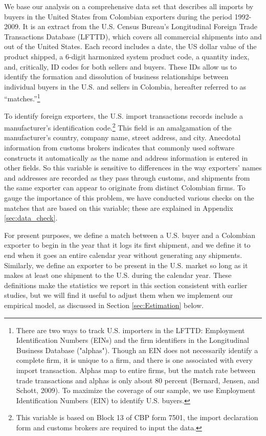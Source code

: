 \documentclass[12pt]{article}
\begin{document}
We base our analysis on a comprehensive
data set that describes all imports by buyers in the United States from
Colombian exporters during the period 1992-2009. It is an extract from the
U.S. Census Bureau's Longitudinal Foreign Trade Transactions Database
(LFTTD), which covers all commercial shipments into and out of the United
States. Each record includes a date, the US dollar value of the product
shipped, a 6-digit harmonized system product code, a quantity index, and,
critically, ID codes for both sellers and buyers. These IDs allow us to
identify the formation and dissolution of business relationships between
individual buyers in the U.S. and sellers in Colombia, hereafter referred to
as \textquotedblleft matches.\textquotedblright \footnote{%
There are two ways to track U.S. importers in the LFTTD: Employment
Identification Numbers (EINs) and the firm identifiers in the Longitudinal
Business Database ("alphas"). Though an EIN does not necessarily identify a
complete firm, it is unique to a firm, and there is one associated with
every import transaction. Alphas map to entire firms, but the match rate
between trade transactions and alphas is only about 80 percent (Bernard,
Jensen, and Schott, 2009). To maximize the coverage of our sample, we use
Employment Identification Numbers (EIN) to identify U.S. buyers.\medskip }\ 

To identify foreign exporters, the U.S. import transactions records include
a manufacturer's identification code.\footnote{%
This variable is based on Block 13 of CBP form 7501, the import declaration
form and customs brokers are required to input the data.} This field is an
amalgamation of the manufacturer's country, company name, street address,
and city. Anecdotal information from customs brokers indicates that commonly
used software constructs it automatically as the name and address
information is entered in other fields. So this variable is sensitive to
differences in the way exporters' names and addresses are recorded as they
pass through customs, and shipments from the same exporter can appear to
originate from distinct Colombian firms. To gauge the importance of this
problem, we have conducted various checks on the matches that are based on
this variable; these are explained in Appendix \ref{sec:data_check}.


For present purposes, we define a match between a U.S. buyer and a Colombian exporter to begin in the year that it logs its first shipment, and we define it to end when it goes an entire calendar year without generating any shipments. Similarly, we define an exporter to be present in the U.S. market so long as it makes at least one shipment to the U.S. during the calendar year. These definitions make the statistics we report in this section consistent with earlier studies, but we will find it useful to adjust them when we implement our empirical model, as discussed in Section \ref{sec:Estimation} below.
\end{document}
